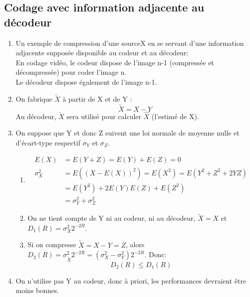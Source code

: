 \documentclass{../../td}
\begin{document}
\subsection{Codage avec information adjacente au décodeur}




\begin{enumerate}
\item Un exemple de compression d'une sourceX en se servant d'une information adjacente supposée disponible au codeur et au décodeur:\\
En codage vidéo, le codeur dispose de l'image n-1 (compressée et décompressée) pour coder l'image n.\\
Le décodeur dispose également de l'image n-1.\\

\item On fabrique $\tilde{X}$ à partir de X et de Y :
\[\tilde{X} = X-Y\]
Au décodeur, $\tilde{X}$ sera utilisé pour calculer $\hat{X}$ (l'estimé de X).\\

\item On suppose que Y et donc Z suivent une loi normale de moyenne nulle et d'écart-type respectif $\sigma_Y$ et $\sigma_Z$.
\begin{enumerate}
\item \begin{align*}
E(X) &= E(Y+Z) = E(Y) + E(Z) = 0\\
\sigma_X^2 &= E((X-E(X))^2) = E(X^2) =E(Y^2 + Z^2 + 2YZ)\\
&= E(Y^2) + 2E(Y)E(Z) +E(Z^2)\\
&= \sigma_Y^2 + \sigma_Z^2
\end{align*}

\item On ne tient compte de Y ni au codeur, ni au décodeur, $\tilde{X} = X$ et $D_1(R) = \sigma_X^2 2^{-2R}$.\\

\item Si on compresse $\tilde{X} = X-Y = Z$, alors $D_2(R) = \sigma_{\tilde{X}}^2 2^{-2R} = (\sigma_X^2 - \sigma_Y^2) 2^{-2R}$. Donc:
\[D_2(R) \leq D_1(R)\]

\end{enumerate}

\item On n'utilise pas Y au codeur, donc à priori, les performances devraient être moins bonnes.



\end{enumerate}
\end{document}
